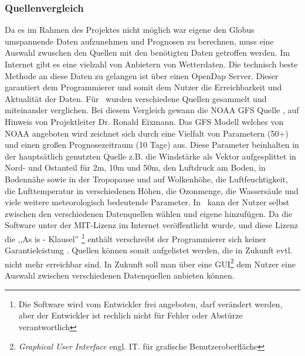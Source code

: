 \subsubsection{Quellenvergleich} %
Da es im Rahmen des Projektes nicht möglich war
eigene den Globus umspannende Daten aufzunehmen und Prognosen zu berechnen,
muss eine Auswahl zwuschen den Quellen mit den benötigten Daten getroffen werden.
Im Internet gibt es eine vielzahl von Anbietern von Wetterdaten.
Die technisch beste Methode an diese Daten zu gelangen ist über einen OpenDap Server.
Dieser garantiert dem Programmierer und somit dem Nutzer
die Erreichbarkeit und Aktualität der Daten.
Für \vs\ wurden verschiedene Quellen gesammelt und miteinander verglichen.
Bei diesem Vergleich
gewann die NOAA GFS Quelle \cite{noaa} , auf Hinweis von Projektleiter Dr. Ronald Eixmann.
Das GFS \cite{gfs} Modell welches von NOAA angeboten wird zeichnet
sich durch eine Vielfalt von Parametern (50+) und einen großen Prognosezeitraum (10 Tage) aus.
Diese Parameter beinhalten in der hauptsätlich genutzten Quelle \cite{bspgfs} z.B.
die Windstärke als Vektor aufgesplittet in Nord- und Ostanteil für 2m, 10m und 50m,
den Luftdruck am Boden, in Bodennähe sowie in der Tropopause und auf Wolkenhöhe,
die Luftfeuchtigkeit, die Lufttemperatur in verschiedenen Höhen, die Ozonmenge, die Wassersäule
und viele weitere meteorologisch bedeutende Parameter.
In \vs\ kann der Nutzer selbst zwischen den verschiedenen Datenquellen wählen und eigene hinzufügen.
Da die Software unter der MIT-Lizenz \cite{mitl} im Internet veröffentlicht wurde,
und diese Lizenz die ,,As is - Klausel''
\footnote{Die Software wird vom Entwickler frei angeboten, darf verändert werden,
aber der Entwickler ist rechlich nicht für Fehler oder Abstürze verantwortlich} enthält verschreibt
der Programmierer sich keiner Garantieleistung \cite{mitl}. Quellen können somit
aufgelistet werden, die in Zukunft evtl. nicht mehr erreichbar sind.
In Zukunft soll man über eine GUI\footnote{\textit{Graphical User Interface} engl. IT.
für grafische Benutzeroberfläche} dem Nutzer eine Auswahl
zwischen verschiedenen Datenquellen anbieten können.



